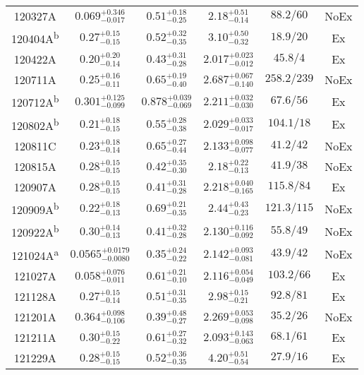 \begin{longtable}{cccccc}
120327A & $0.069^{+0.346}_{-0.017}$ & $0.51^{+0.18}_{-0.25}$ & $2.18^{+0.51}_{-0.14}$ & $88.2/60$ & NoEx\\[2pt] 
120404A\textsuperscript{b} & $0.27^{+0.15}_{-0.15}$ & $0.52^{+0.32}_{-0.35}$ & $3.10^{+0.50}_{-0.32}$ & $18.9/20$ & Ex\\[2pt] 
120422A & $0.20^{+0.20}_{-0.14}$ & $0.43^{+0.31}_{-0.28}$ & $2.017^{+0.023}_{-0.012}$ & $45.8/4$ & Ex\\[2pt] 
120711A & $0.25^{+0.16}_{-0.11}$ & $0.65^{+0.19}_{-0.40}$ & $2.687^{+0.067}_{-0.140}$ & $258.2/239$ & NoEx\\[2pt] 
120712A\textsuperscript{b} & $0.301^{+0.125}_{-0.099}$ & $0.878^{+0.039}_{-0.069}$ & $2.211^{+0.032}_{-0.030}$ & $67.6/56$ & Ex\\[2pt] 
120802A\textsuperscript{b} & $0.21^{+0.18}_{-0.15}$ & $0.55^{+0.28}_{-0.38}$ & $2.029^{+0.033}_{-0.017}$ & $104.1/18$ & Ex\\[2pt] 
120811C & $0.23^{+0.18}_{-0.14}$ & $0.65^{+0.27}_{-0.44}$ & $2.133^{+0.098}_{-0.077}$ & $41.2/42$ & NoEx\\[2pt] 
120815A & $0.28^{+0.15}_{-0.15}$ & $0.42^{+0.35}_{-0.30}$ & $2.18^{+0.22}_{-0.13}$ & $41.9/38$ & NoEx\\[2pt] 
120907A & $0.28^{+0.15}_{-0.15}$ & $0.41^{+0.31}_{-0.28}$ & $2.218^{+0.040}_{-0.165}$ & $115.8/84$ & Ex\\[2pt] 
120909A\textsuperscript{b} & $0.22^{+0.18}_{-0.13}$ & $0.69^{+0.21}_{-0.35}$ & $2.44^{+0.43}_{-0.23}$ & $121.3/115$ & NoEx\\[2pt] 
120922A\textsuperscript{b} & $0.30^{+0.14}_{-0.13}$ & $0.41^{+0.32}_{-0.28}$ & $2.130^{+0.116}_{-0.092}$ & $55.8/49$ & NoEx\\[2pt] 
121024A\textsuperscript{a} & $0.0565^{+0.0179}_{-0.0080}$ & $0.35^{+0.24}_{-0.22}$ & $2.142^{+0.093}_{-0.081}$ & $43.9/42$ & NoEx\\[2pt] 
121027A & $0.058^{+0.076}_{-0.011}$ & $0.61^{+0.21}_{-0.10}$ & $2.116^{+0.054}_{-0.049}$ & $103.2/66$ & Ex\\[2pt] 
121128A & $0.27^{+0.15}_{-0.14}$ & $0.51^{+0.31}_{-0.35}$ & $2.98^{+0.15}_{-0.21}$ & $92.8/81$ & Ex\\[2pt] 
121201A & $0.364^{+0.098}_{-0.106}$ & $0.39^{+0.48}_{-0.27}$ & $2.269^{+0.053}_{-0.098}$ & $35.2/26$ & NoEx\\[2pt] 
121211A & $0.30^{+0.15}_{-0.22}$ & $0.61^{+0.27}_{-0.32}$ & $2.093^{+0.143}_{-0.063}$ & $68.1/61$ & Ex\\[2pt] 
121229A & $0.28^{+0.15}_{-0.15}$ & $0.52^{+0.36}_{-0.35}$ & $4.20^{+0.51}_{-0.54}$ & $27.9/16$ & Ex\\[2pt] 
\end{longtable} 

